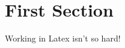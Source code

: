 \documentclass{article}
\begin{document}



\section*{First Section}
Working in Latex isn't so hard! 
\end{document}
